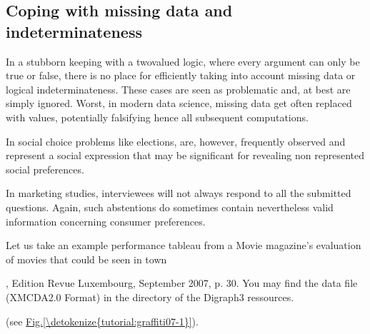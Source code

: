 \documentclass[a4paper,10pt,english]{sphinxhowto}
\begin{document}
\subsection{Coping with missing data and indeterminateness}
\label{\detokenize{tutorial:coping-with-missing-data-and-indeterminateness}}
In a stubborn keeping with a two\sphinxhyphen{}valued logic, where every argument can only be true or false, there is no place for efficiently taking into account missing data or logical indeterminateness. These cases are seen as problematic and, at best are simply ignored. Worst, in modern data science, missing data get often replaced with  values, potentially falsifying hence all subsequent computations.

In social choice problems like elections,  are, however, frequently observed and represent a social expression that may be significant for revealing non represented social preferences.

In marketing studies, interviewees will not always respond to all the submitted questions. Again, such abstentions do sometimes contain nevertheless valid information concerning consumer preferences.

Let us take an example performance tableau from a Movie magazine’s evaluation of movies that could be seen in town %
\begin{footnote}[9]\sphinxAtStartFootnote
{}, Edition Revue Luxembourg, September 2007, p. 30. You may find the data file  (XMCDA\sphinxhyphen{}2.0 Format) in the  directory of the Digraph3 ressources.
%
\end{footnote} (see \hyperref[\detokenize{tutorial:graffiti07-1}]{Fig.\@ \ref{\detokenize{tutorial:graffiti07-1}}}).

\begin{sphinxVerbatim}[commandchars=\\\{\},numbers=left,firstnumber=1,stepnumber=1]
   
  
\end{sphinxVerbatim}
\end{document}
